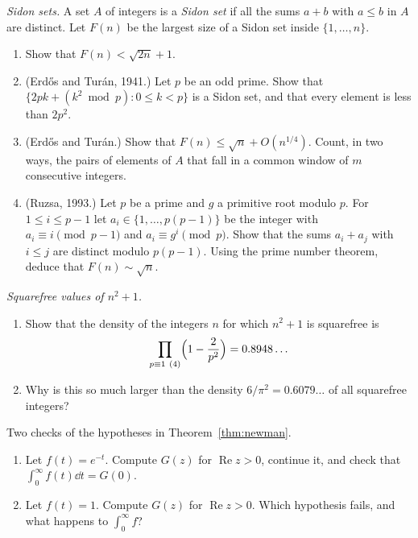 \begin{exercise}[$\star\star$]\label{pb:sidon}
\emph{Sidon sets.} A set $A$ of integers is a \emph{Sidon set} if all the sums $a+b$ with $a\le b$ in $A$ are distinct. Let $F(n)$ be the largest size of a Sidon set inside $\{1,\dots,n\}$.
\begin{enumerate}[label=(\alph*)]
\item Show that $F(n)<\sqrt{2n}+1$.
\item (Erdős and Turán, 1941.) Let $p$ be an odd prime. Show that $\{2pk+(k^2\bmod p):0\le k<p\}$ is a Sidon set, and that every element is less than $2p^2$.
\item (Erdős and Turán.) Show that $F(n)\le\sqrt n+O(n^{1/4})$. Count, in two ways, the pairs of elements of $A$ that fall in a common window of $m$ consecutive integers.
\item (Ruzsa, 1993.) Let $p$ be a prime and $g$ a primitive root modulo $p$. For $1\le i\le p-1$ let $a_i\in\{1,\dots,p(p-1)\}$ be the integer with $a_i\equiv i\pmod{p-1}$ and $a_i\equiv g^i\pmod p$. Show that the sums $a_i+a_j$ with $i\le j$ are distinct modulo $p(p-1)$. Using the prime number theorem, deduce that $F(n)\sim\sqrt n$.
\end{enumerate}
\end{exercise}

\begin{exercise}[$\star\star$]\label{pb:nsq1sqfree}
\emph{Squarefree values of $n^2+1$.}
\begin{enumerate}[label=(\alph*)]
\item Show that the density of the integers $n$ for which $n^2+1$ is squarefree is
\[
\prod_{p\equiv1\ (4)}\Bigl(1-\frac2{p^2}\Bigr)=0.8948\ldots
\]
\item Why is this so much larger than the density $6/\pi^2=0.6079\ldots$ of all squarefree integers?
\end{enumerate}
\end{exercise}

\begin{exercise}[$\star$]\label{ex:laplacecheck}
Two checks of the hypotheses in Theorem~\ref{thm:newman}.
\begin{enumerate}[label=(\alph*)]
\item Let $f(t)=e^{-t}$. Compute $G(z)$ for $\operatorname{Re}z>0$, continue it, and check that $\int_0^\infty f(t)\dd t=G(0)$.
\item Let $f(t)=1$. Compute $G(z)$ for $\operatorname{Re}z>0$. Which hypothesis fails, and what happens to $\int_0^\infty f$?
\end{enumerate}
\end{exercise}

